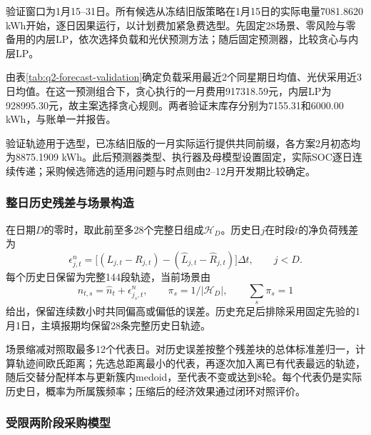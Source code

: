 验证窗口为1月15--31日。所有候选从冻结旧版策略在1月15日的实际电量7081.8620 kWh开始，逐日因果运行，以计划费加紧急费选型。先固定28场景、零风险与零备用的内层LP，依次选择负载和光伏预测方法；随后固定预测器，比较贪心与内层LP。



由表\ref{tab:q2-forecast-validation}确定负载采用最近2个同星期日均值、光伏采用近3日均值。在这一预测组合下，贪心执行的一月费用917318.59元，内层LP为928995.30元，故主案选择贪心规则。两者验证末库存分别为7155.31和6000.00 kWh，与账单一并报告。

验证轨迹用于选型，已冻结旧版的一月实际运行提供共同前缀，各方案2月初态均为8875.1909 kWh。此后预测器类型、执行器及母模型设置固定，实际SOC逐日连续传递；采购候选筛选的适用问题与时点则由2--12月开发期比较确定。

\subsubsection{整日历史残差与场景构造}

在日期$D$的零时，取此前至多28个完整日组成$\mathcal H_D$。历史日$j$在时段$t$的净负荷残差为
\begin{equation}
 \epsilon^n_{j,t}=
 \big[(L_{j,t}-R_{j,t})-(\widehat L_{j,t}-\widehat R_{j,t})\big]\Delta t,
 \qquad j<D.
 \label{eq:residual}
\end{equation}
每个历史日保留为完整144段轨迹，当前场景由
\begin{equation}
 n_{t,s}=\widehat n_t+\epsilon^n_{j_s,t},\qquad
 \pi_s=1/|\mathcal H_D|,\qquad \sum_s\pi_s=1
 \label{eq:q2_empirical_scenarios}
\end{equation}
给出，保留连续数小时共同偏高或偏低的误差。历史充足后排除采用固定先验的1月1日，主填报期均保留28条完整历史日轨迹。

场景缩减对照取最多12个代表日。对历史误差按整个残差块的总体标准差归一，计算轨迹间欧氏距离；先选总距离最小的代表，再逐次加入离已有代表最远的轨迹，随后交替分配样本与更新簇内medoid，至代表不变或达到8轮。每个代表仍是实际历史日，概率为所属簇频率；压缩后的经济效果通过闭环对照评价。

\subsubsection{受限两阶段采购模型}


